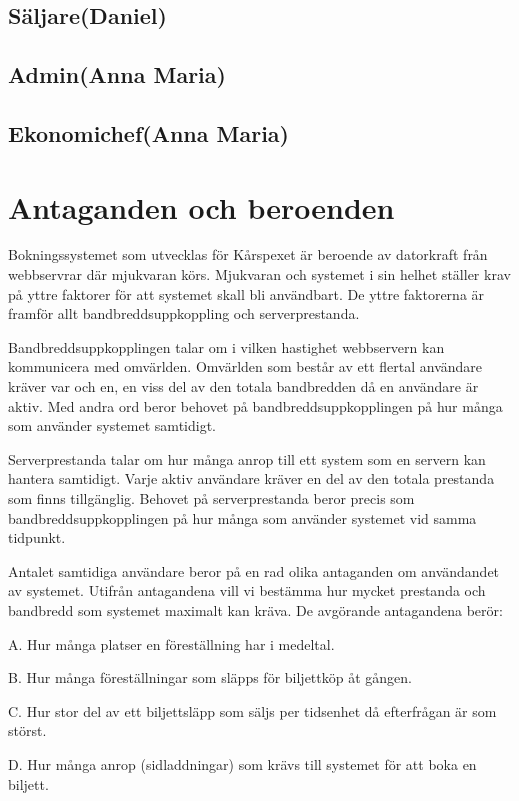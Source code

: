 \documentclass[a4paper, twoside, 11pt, titlepage]{article}
\begin{document}
	\subsection{Säljare(Daniel)}


	\subsection{Admin(Anna Maria)}


	\subsection{Ekonomichef(Anna Maria)}


\section{Antaganden och beroenden}

Bokningssystemet som utvecklas för Kårspexet är beroende av datorkraft från webbservrar där mjukvaran körs. Mjukvaran och systemet i sin helhet ställer krav på yttre faktorer för att systemet skall bli användbart. De yttre faktorerna är framför allt bandbreddsuppkoppling och serverprestanda.

Bandbreddsuppkopplingen talar om i vilken hastighet webbservern kan kommunicera med omvärlden. Omvärlden som består av ett flertal användare kräver var och en, en viss del av den totala bandbredden då en användare är aktiv. Med andra ord beror behovet på bandbreddsuppkopplingen  på hur många som använder systemet samtidigt.

Serverprestanda talar om hur många anrop till ett system som en servern kan hantera samtidigt. Varje aktiv användare kräver en del av den totala prestanda som finns tillgänglig. Behovet på serverprestanda beror precis som bandbreddsuppkopplingen på hur många som använder systemet vid samma tidpunkt.

Antalet samtidiga användare beror på en rad olika antaganden om användandet av systemet. Utifrån antagandena vill vi bestämma hur mycket prestanda och bandbredd som systemet maximalt kan kräva. De avgörande antagandena berör:

A.	Hur många platser en föreställning har i medeltal.

B.	Hur många föreställningar som släpps för biljettköp åt gången.

C.	Hur stor del av ett biljettsläpp som säljs per tidsenhet då efterfrågan är som störst.

D.	Hur många anrop (sidladdningar) som krävs till systemet för att boka en biljett.
\end{document}
